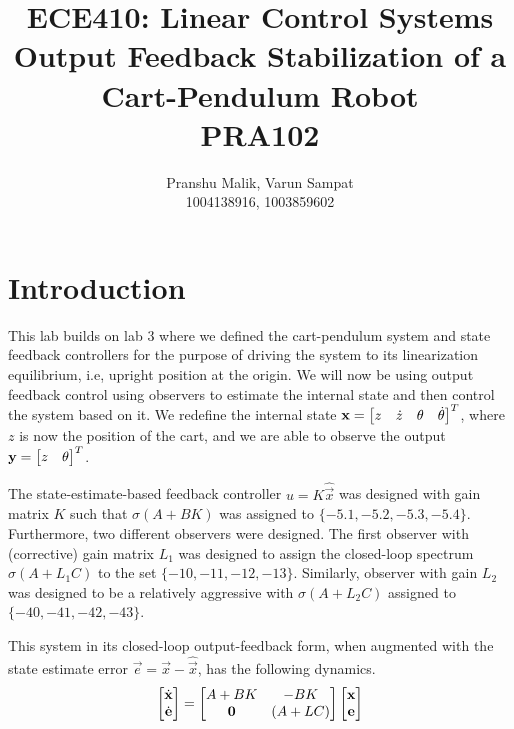\documentclass[10pt]{article}
\date{}
\begin{document}
\title{\textbf{\Large{\textsc{ECE410:} Linear Control Systems}} \\ \Large{Output Feedback Stabilization of a Cart-Pendulum Robot} \\ \textbf{\small{PRA102}}\vspace{-0.3cm}}
\author{Pranshu Malik, Varun Sampat \\ \footnotesize{1004138916}, \footnotesize{1003859602}\vspace{-3cm}}

\maketitle

\section{Introduction}
This lab builds on lab 3 where we defined the cart-pendulum system and state feedback controllers for the purpose of driving the system to its linearization equilibrium, i.e, upright position at the origin. We will now be using output feedback control using observers to estimate the internal state and then control the system based on it. We redefine the internal state $\mathbf{x} = \begin{bmatrix} z & \dot{z} & \theta & \dot{\theta} \end{bmatrix}^{T}$, where $z$ is now the position of the cart, and we are able to observe the output $\mathbf{y} = \begin{bmatrix} z & \theta \end{bmatrix}^{T}$. 

The state-estimate-based feedback controller $u = K\hat{\vec{x}}$ was designed with gain matrix $K$ such that $\sigma(A+BK)$ was assigned to $\{-5.1, -5.2, -5.3, -5.4\}$. Furthermore, two different observers were designed. The first observer with (corrective) gain matrix $L_1$ was designed to assign the closed-loop spectrum $\sigma(A+L_1C)$ to the set $\{-10, -11, -12, -13\}$. Similarly, observer with gain $L_2$ was designed to be a relatively aggressive with $\sigma(A+L_2C)$ assigned to $\{-40, -41, -42, -43\}$.

This system in its closed-loop output-feedback form, when augmented with the state estimate error $\vec{e} = \vec{x} - \hat{\vec{x}}$, has the following dynamics.
\begin{equation*}
    \begin{bmatrix} \dot{\mathbf{x}}\\\dot{\mathbf{e}} \end{bmatrix} = \begin{bmatrix} A + BK & -BK\\ \mathbf{0} & (A+LC) \end{bmatrix}\begin{bmatrix} \mathbf{x}\\ \mathbf{e} \end{bmatrix}
\end{equation*}
\end{document}
